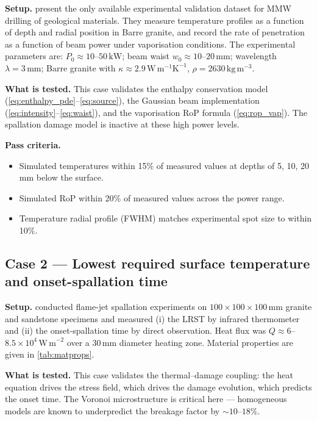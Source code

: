 \documentclass[12pt, a4paper]{article}
\begin{document}
\textbf{Setup.}  \citet{zhang2023thermal} present the only available experimental
validation dataset for MMW drilling of geological materials.  They measure
temperature profiles as a function of depth and radial position in Barre granite,
and record the rate of penetration as a function of beam power under vaporisation
conditions.  The experimental parameters are: $P_0 \approx 10$--$50\,\mathrm{kW}$;
beam waist $w_0 \approx 10$--$20\,\mathrm{mm}$; wavelength $\lambda = 3\,\mathrm{mm}$;
Barre granite with $\kappa \approx 2.9\,\mathrm{W\,m^{-1}K^{-1}}$,
$\rho = 2630\,\mathrm{kg\,m^{-3}}$.

\textbf{What is tested.}  This case validates the enthalpy conservation model
(\cref{eq:enthalpy_pde}--\cref{eq:source}), the Gaussian beam implementation
(\cref{eq:intensity}--\cref{eq:waist}), and the vaporisation RoP formula
(\cref{eq:rop_vap}).  The spallation damage model is inactive at these high power
levels.

\textbf{Pass criteria.}
\begin{itemize}[noitemsep]
    \item Simulated temperatures within 15\% of measured values at depths of
          5, 10, 20\,mm below the surface.
    \item Simulated RoP within 20\% of measured values across the power range.
    \item Temperature radial profile (FWHM) matches experimental spot size to
          within 10\%.
\end{itemize}

\subsection{Case 2 — Lowest required surface temperature and onset-spallation
            time \textnormal{\citep{hu2018lrst}}}
\label{sec:val_hu}

\textbf{Setup.}  \citet{hu2018lrst} conducted flame-jet spallation experiments on
$100\times100\times100\,\mathrm{mm}$ granite and sandstone specimens and measured
(i) the LRST by infrared thermometer and (ii) the onset-spallation time by
direct observation.  Heat flux was $Q \approx 6$--$8.5\times10^4\,\mathrm{W\,m}^{-2}$
over a 30\,mm diameter heating zone.  Material properties are given in
\cref{tab:matprops}.

\textbf{What is tested.}  This case validates the thermal--damage coupling:
the heat equation drives the stress field, which drives the damage evolution, which
predicts the onset time.  The Voronoi microstructure is critical here — homogeneous
models are known to underpredict the breakage factor by $\sim 10$--$18\%$.
\end{document}
